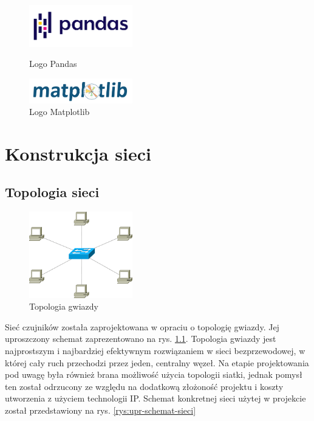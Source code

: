 \documentclass[12pt,oneside,a4paper]{book}
\theoremstyle{break}
\begin{document}
\begin{figure}[H]
    \begin{center}
        \includegraphics[width=0.4\textwidth]{numpylogo.png}        
        \caption{Logo Pandas}        
        \label{rys:numpylogo}
    \end{center}
    \begin{center}
        \includegraphics[width=0.4\textwidth]{matplotliblogo.png}        
        \caption{Logo Matplotlib}        
        \label{rys:numpylogo}
    \end{center}
\end{figure}

\chapter{Konstrukcja sieci}
\section{Topologia sieci}

\begin{figure}
    \begin{center}
        \includegraphics[width=0.4\textwidth]{topologia_gwiazdy.png}        
        \caption{Topologia gwiazdy}        
        \label{rys:topologia}
    \end{center}
\end{figure}

Sieć czujników została zaprojektowana w opraciu o topologię gwiazdy. Jej
uproszczony schemat zaprezentowano na rys. \ref{rys:topologia}.
Topologia gwiazdy jest najprostszym i najbardziej efektywnym rozwiązaniem w 
sieci bezprzewodowej, w której cały ruch przechodzi przez jeden, centralny
węzeł. Na etapie projektowania pod uwagę była również brana 
możliwość użycia 
topologii siatki, jednak pomysł ten został odrzucony ze względu na 
dodatkową złożoność projektu i koszty utworzenia z użyciem technologii
IP.
Schemat konkretnej sieci użytej w projekcie
został przedstawiony na rys. \ref{rys:upr-schemat-sieci}
\end{document}
